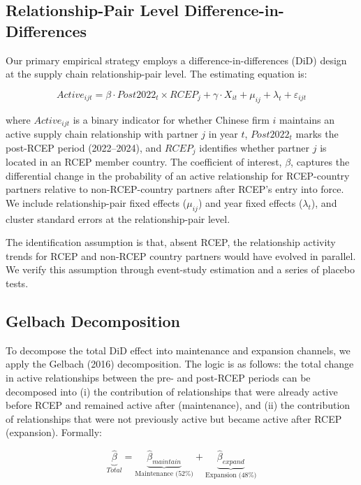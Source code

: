 \documentclass[preprint,12pt,authoryear]{elsarticle}
\begin{document}
\subsection{Relationship-Pair Level Difference-in-Differences}

Our primary empirical strategy employs a difference-in-differences (DiD) design at the supply chain relationship-pair level. The estimating equation is:

\begin{equation}
\label{eq:did}
Active_{ijt} = \beta \cdot Post2022_t \times RCEP_j + \gamma \cdot X_{it} + \mu_{ij} + \lambda_t + \varepsilon_{ijt}
\end{equation}

where $Active_{ijt}$ is a binary indicator for whether Chinese firm $i$ maintains an active supply chain relationship with partner $j$ in year $t$, $Post2022_t$ marks the post-RCEP period (2022--2024), and $RCEP_j$ identifies whether partner $j$ is located in an RCEP member country. The coefficient of interest, $\beta$, captures the differential change in the probability of an active relationship for RCEP-country partners relative to non-RCEP-country partners after RCEP's entry into force. We include relationship-pair fixed effects ($\mu_{ij}$) and year fixed effects ($\lambda_t$), and cluster standard errors at the relationship-pair level.

The identification assumption is that, absent RCEP, the relationship activity trends for RCEP and non-RCEP country partners would have evolved in parallel. We verify this assumption through event-study estimation and a series of placebo tests.

\subsection{Gelbach Decomposition}

To decompose the total DiD effect into maintenance and expansion channels, we apply the Gelbach (2016) decomposition. The logic is as follows: the total change in active relationships between the pre- and post-RCEP periods can be decomposed into (i) the contribution of relationships that were already active before RCEP and remained active after (maintenance), and (ii) the contribution of relationships that were not previously active but became active after RCEP (expansion). Formally:

\begin{equation}
\label{eq:gelbach}
\underbrace{\hat{\beta}}_{Total} = \underbrace{\hat{\beta}_{maintain}}_{\text{Maintenance (52\%)}} + \underbrace{\hat{\beta}_{expand}}_{\text{Expansion (48\%)}}
\end{equation}
\end{document}

